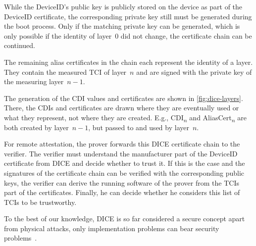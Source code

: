 
While the DeviceID's public key is publicly stored on the device as part of the DeviceID certificate, the corresponding private key still must be generated during the boot process.
Only if the matching private key can be generated, which is only possible if the identity of layer~0 did not change, the certificate chain can be continued.


The remaining alias certificates in the chain each represent the identity of a layer.
They contain the measured \ac{TCI} of layer~\( n \) and are signed with the private key of the measuring layer~\( n-1 \).


The generation of the \ac{CDI} values and certificates are shown in \autoref{fig:dice-layers}.
There, the \acp{CDI} and certificates are drawn where they are eventually used or what they represent, not where they are created.
E.g., CDI\textsubscript{\(n\)} and AliasCert\textsubscript{\(n\)} are both created by layer~\( n-1 \), but passed to and used by layer~\( n \).


For remote attestation, the prover forwards this DICE certificate chain to the verifier.
The verifier must understand the manufacturer part of the DeviceID certificate from DICE and decide whether to trust it.
If this is the case and the signatures of the certificate chain can be verified with the corresponding public keys, the verifier can derive the running software of the prover from the \acp{TCI} part of the certificates.
Finally, he can decide whether he considers this list of \acp{TCI} to be trustworthy.


To the best of our knowledge, \ac{DICE} is so far considered a secure concept apart from physical attacks, only implementation problems can bear security problems~\cite{Jaeger2020, Hristozov2022}.
